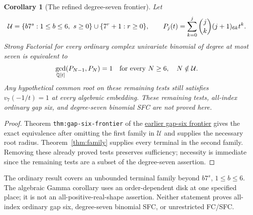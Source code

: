 \documentclass[11pt]{article}
\newtheorem{corollary}[lemma]{Corollary}
\begin{document}
\begin{corollary}[The refined degree-seven frontier]
\label{cor:degree-seven-frontier}
Let
\[
 {\cal U}=\{b7^s:1\le b\le6,\ s\ge0\}
                \cup\{7^r+1:r\ge0\},\qquad
 P_j(t)=\sum_{k=0}^j\binom jk(j+1)_{6k}t^k.
\]
Strong Factorial for every ordinary complex univariate binomial
of degree at most seven is equivalent to
\[
 \gcd_{\mathbb Q[t]}(P_{N-1},P_N)=1
              \quad\text{for every }N\ge6,\quad N\notin{\cal U}.
\]
Any hypothetical common root on these remaining tests still
satisfies $v_7(-1/t)=1$ at every algebraic embedding.
These remaining tests, all-index ordinary gap six, and degree-seven
binomial SFC are not proved here.
\end{corollary}
\begin{proof}
Theorem \texttt{thm:gap-six-frontier} of the
\href{ORDINARY_DEGREE_SEVEN_GAP_SIX_FRONTIER.tex}{earlier gap-six frontier}
gives the exact equivalence after omitting the first family in
$\mathcal U$ and supplies the necessary root radius.
Theorem~\ref{thm:family} supplies every terminal in the second
family. Removing these already proved tests preserves sufficiency;
necessity is immediate since the remaining tests are a subset
of the degree-seven assertion.
\end{proof}
The ordinary result covers an unbounded terminal family beyond
$b7^s$, $1\le b\le6$.
The algebraic Gamma corollary uses an order-dependent disk at one
specified place; it is not an all-positive-real-shape assertion.
Neither statement proves all-index ordinary gap six,
degree-seven binomial SFC, or unrestricted FC/SFC.
\end{document}
